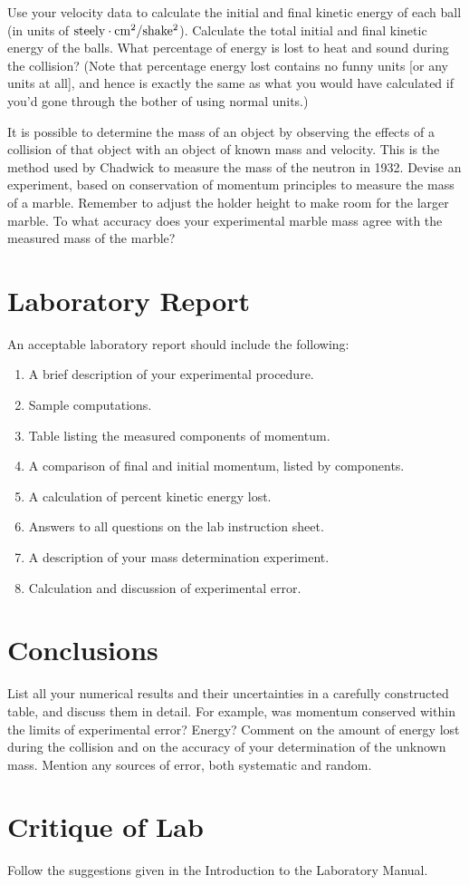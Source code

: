      Use your velocity data to calculate the initial and final kinetic
energy of each ball (in units of ${\rm steely\cdot cm^2/shake^2}$).  Calculate the total initial
and final kinetic energy of the balls.  What percentage of energy is
lost to heat and sound during the collision?  (Note that percentage energy lost
contains no funny units [or any units at all], and hence is exactly the same
as what you would have calculated if you'd gone through the bother of using normal
units.)

     It is possible to determine the mass of an object by observing the
effects of a collision of that object with an object of known mass and
velocity.  This is the method used by Chadwick to measure the mass of
the neutron in 1932.  Devise an experiment, based on conservation of
momentum principles to measure the mass of a marble. Remember to adjust
the holder height to make room for the larger marble.
To what accuracy does your experimental marble
mass agree with the measured mass of the marble?

\section*{Laboratory Report}
An acceptable laboratory report should include the following:
\begin{enumerate}
\item A brief description of your experimental procedure.
\item Sample computations.
\item Table listing the measured components of momentum.
\item A comparison of final and initial momentum, listed by components.
\item A calculation of percent kinetic energy lost.
\item Answers to all questions on the lab instruction
          sheet.
\item A description of your mass determination experiment.
\item Calculation and discussion of experimental error.
\end{enumerate}

\section*{Conclusions}
List all your numerical results and their uncertainties in a carefully
constructed table, and discuss them in detail.  For example, was momentum
conserved within the limits of experimental error?  Energy?
Comment on the amount of energy lost during the collision and on the
accuracy of your determination of the unknown mass.  Mention any sources of
error, both systematic and random.

\section*{Critique of Lab}
     Follow the suggestions given in the Introduction to the
Laboratory Manual.

